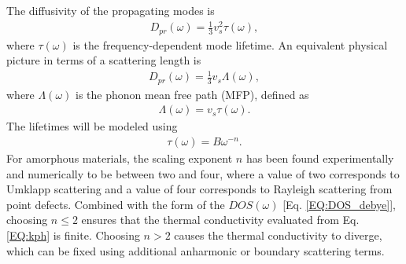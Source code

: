 \documentclass[aps,prb,twocolumn,superscriptaddress,footinbib,amsmath,amssymb,floatfix]{revtex4}
\begin{document}
The diffusivity of the propagating modes is    
\begin{equation}\label{EQ:Dtau}
\begin{split}
D_{pr}(\omega) = \frac{1}{3}v^2_s\tau(\omega),
\end{split}
\end{equation}
where $\tau(\omega)$ is the frequency-dependent mode 
lifetime.\cite{ziman_electrons_2001} An equivalent physical 
picture in terms of a scattering length is
\begin{equation}\label{EQ:DLambda}
\begin{split}
D_{pr}(\omega) = \frac{1}{3}v_s \Lambda(\omega),
\end{split}
\end{equation}
where $\Lambda(\omega)$ is the phonon mean free path (MFP), defined as 
\begin{equation}\label{EQ:Lambda}
\begin{split}
\Lambda(\omega) = v_{s} \tau(\omega).
\end{split}
\end{equation}
The lifetimes will be modeled using 
\begin{equation}\label{EQ:tauw2}
\begin{split}
\tau(\omega) = B \omega^{-n}.
\end{split}
\end{equation}
For amorphous materials, the scaling exponent $n$ 
has been found experimentally and numerically to be 
between two and four,
\cite{vacher_ultrasonic_1981,
feldman_thermal_1993,morath_phonon_1996,benassi_evidence_1996,
feldman_numerical_1999,taraskin_determination_1999,
taraskin_propagation_2000,gotze_evolution_2000,ruocco_relaxation_2000,
ruocco_high-frequency_2001,horbach_high_2001,
matic_sound_2001,
feldman_calculations_2002,ruffle_observation_2003,
masciovecchio_evidence_2006,schirmacher_acoustic_2007,
christie_vibrational_2007,
shintani_universal_2008,xu_energy_2009,
liu_high_2009,ganter_rayleigh_2010,
vitelli_heat_2010,
baldi_sound_2010,yang_anomalously_2010,
wyart_scaling_2010,baldi_elastic_2011,
he_heat_2011,ayrinhac_subterahertz_2011,
baldi_emergence_2013}
where a value of two corresponds to 
Umklapp scattering\cite{callaway_model_1959} and a value of four 
corresponds to 
Rayleigh scattering from point defects.\cite{klemens_scattering_1955}
Combined with the form of the $DOS(\omega)$ 
[Eq. \eqref{EQ:DOS_debye}], choosing $n\le2$ ensures that the 
thermal conductivity evaluated from Eq. \eqref{EQ:kph} is finite. 
Choosing $n>2$ causes the thermal conductivity to diverge,   
which can be fixed using additional anharmonic
\cite{feldman_thermal_1993,feldman_numerical_1999} 
or boundary scattering terms.
\cite{cahill_thermal_1994,liu_high_2009,yang_anomalously_2010}
\end{document}
